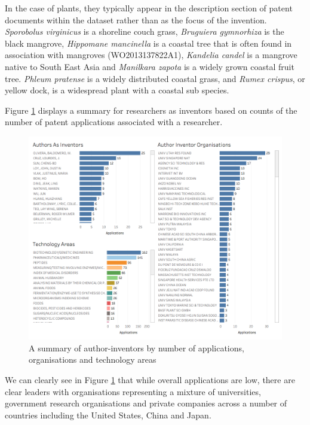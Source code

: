 \documentclass[]{book}
\theoremstyle{definition}
\theoremstyle{definition}
\theoremstyle{definition}
\theoremstyle{remark}
\begin{document}
In the case of plants, they typically appear in the description section
of patent documents within the dataset rather than as the focus of the
invention. \emph{Sporobolus virginicus} is a shoreline couch grass,
\emph{Bruguiera gymnorhiza} is the black mangrove, \emph{Hippomane
mancinella} is a coastal tree that is often found in association with
mangroves (WO2013137822A1), \emph{Kandelia candel} is a mangrove native
to South East Asia and \emph{Manilkara zapota} is a widely grown coastal
fruit tree. \emph{Phleum pratense} is a widely distributed coastal
grass, and \emph{Rumex crispus}, or yellow dock, is a widespread plant
with a coastal sub species.

Figure \ref{fig:authorinventordash} displays a summary for researchers
as inventors based on counts of the number of patent applications
associated with a researcher.

\begin{figure}

{\centering \includegraphics[width=1\linewidth]{images-patents/author_inventor_dashboard} 

}

\caption{A summary of author-inventors by number of applications, organisations and technology areas}\label{fig:authorinventordash}
\end{figure}

We can clearly see in Figure \ref{fig:authorinventordash} that while
overall applications are low, there are clear leaders with organisations
representing a mixture of universities, government research
organisations and private companies across a number of countries
including the United States, China and Japan.
\end{document}
